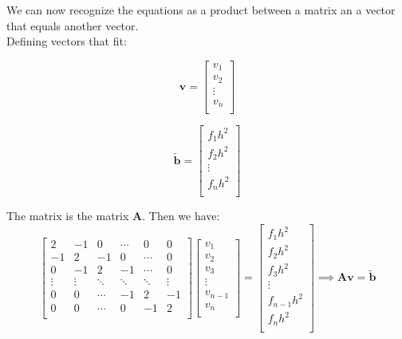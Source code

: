 We can now recognize the equations as a product between a matrix an a vector that equals another vector.\\

Defining vectors that fit:
\begin{multicols}{3}
$$\textbf{v} = \begin{bmatrix}
	v_1\\
	v_2\\
	\vdots\\
	v_{n}\\
\end{bmatrix}$$

$$ \tilde{\textbf{b}} = \begin{bmatrix}
	f_1 h^2\\
	f_2 h^2\\
	\vdots\\
	f_{n} h^2\\
\end{bmatrix} $$
\end{multicols}

The matrix is the matrix $\textbf{A}$. Then we have:
\[
    \begin{bmatrix}
    	2& -1& 0 &\cdots & 0 &0 \\
        -1 & 2 & -1 &0 &\cdots &0 \\
        0&-1 &2 & -1 & \cdots & 0 \\
        \vdots& \vdots & \ddots &\ddots &\ddots & \vdots \\
        0&0 & \cdots &-1 &2& -1 \\
        0&0 & \cdots & 0  &-1 & 2 \\
        \end{bmatrix}
\begin{bmatrix}
	v_1\\
	v_2\\
	v_3\\
	\vdots\\
	v_{n-1}\\
	v_{n}\\
\end{bmatrix}=
\begin{bmatrix}
	f_1 h^2\\
	f_2 h^2\\
	f_3 h^2\\
	\vdots\\
	f_{n-1} h^2\\
	f_{n} h^2\\
\end{bmatrix}
\implies \mathbf{A}\mathbf{v}=\tilde{\mathbf{b}}
\]

